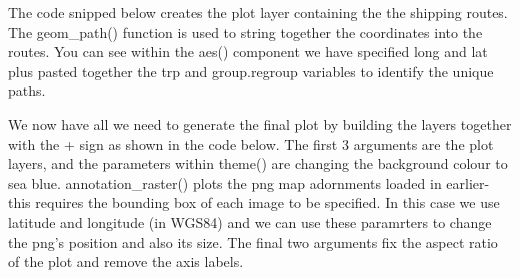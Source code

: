 \documentclass[]{article}
\newenvironment{Shaded}{}{}
\newcommand{\KeywordTok}[1]{\textcolor[rgb]{0.00,0.44,0.13}{\textbf{{#1}}}}
\newcommand{\DataTypeTok}[1]{\textcolor[rgb]{0.56,0.13,0.00}{{#1}}}
\newcommand{\FloatTok}[1]{\textcolor[rgb]{0.25,0.63,0.44}{{#1}}}
\newcommand{\StringTok}[1]{\textcolor[rgb]{0.25,0.44,0.63}{{#1}}}
\newcommand{\NormalTok}[1]{{#1}}
\begin{document}
The code snipped below creates the plot layer containing the the
shipping routes. The geom\_path() function is used to string together
the coordinates into the routes. You can see within the aes() component
we have specified long and lat plus pasted together the trp and
group.regroup variables to identify the unique paths.

\begin{Shaded}
\end{Shaded}
We now have all we need to generate the final plot by building the
layers together with the + sign as shown in the code below. The first 3
arguments are the plot layers, and the parameters within theme() are
changing the background colour to sea blue. annotation\_raster() plots
the png map adornments loaded in earlier- this requires the bounding box
of each image to be specified. In this case we use latitude and
longitude (in WGS84) and we can use these paramrters to change the png's
position and also its size. The final two arguments fix the aspect ratio
of the plot and remove the axis labels.
\end{document}
